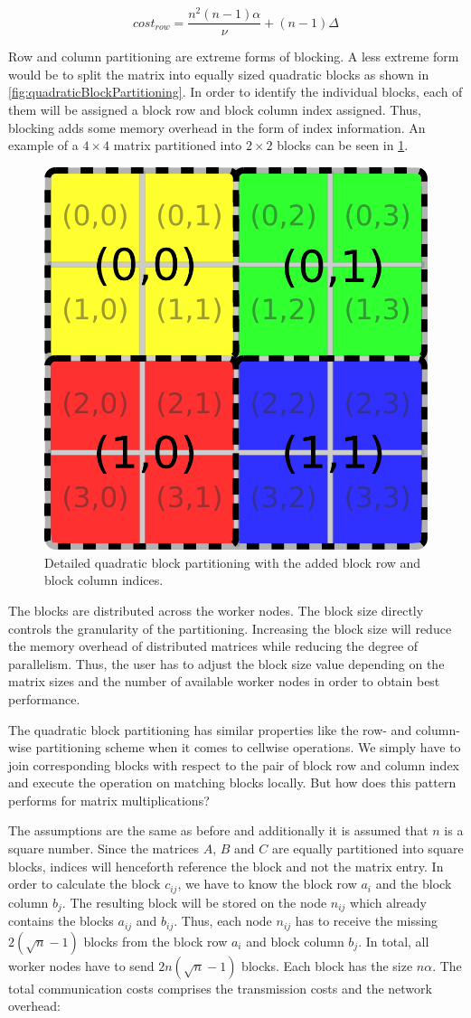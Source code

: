 \begin{displaymath}
	cost_{row} = \frac{n^2(n-1)\alpha}{\nu} + (n-1)\Delta
\end{displaymath}

Row and column partitioning are extreme forms of blocking.
A less extreme form would be to split the matrix into equally sized quadratic blocks as shown in \cref{fig:quadraticBlockPartitioning}.
In order to identify the individual blocks, each of them will be assigned a block row and block column index assigned.
Thus, blocking adds some memory overhead in the form of index information.
An example of a $4\times 4$ matrix partitioned into $2\times 2$ blocks can be seen in \cref{fig:quadraticBlockPartitioningDetailed}.

\begin{figure}[!h]
	\centering
	\includegraphics[width=0.25\linewidth]{images/quadraticBlockPartitioningDetailed.png}
	\caption{Detailed quadratic block partitioning with the added block row and block column indices.}
	\label{fig:quadraticBlockPartitioningDetailed}
\end{figure}

The blocks are distributed across the worker nodes.
The block size directly controls the granularity of the partitioning.
Increasing the block size will reduce the memory overhead of distributed matrices while reducing the degree of parallelism.
Thus, the user has to adjust the block size value depending on the matrix sizes and the number of available worker nodes in order to obtain best performance.

The quadratic block partitioning has similar properties like the row- and column-wise partitioning scheme when it comes to cellwise operations.
We simply have to join corresponding blocks with respect to the pair of block row and column index and execute the operation on matching blocks locally.
But how does this pattern performs for matrix multiplications?

The assumptions are the same as before and additionally it is assumed that $n$ is a square number.
Since the matrices $A$, $B$ and $C$ are equally partitioned into square blocks, indices will henceforth reference the block and not the matrix entry.
In order to calculate the block $c_{ij}$, we have to know the block row $a_{i}$ and the block column $b_{j}$.
The resulting block will be stored on the node $n_{ij}$ which already contains the blocks $a_{ij}$ and $b_{ij}$.
Thus, each node $n_{ij}$ has to receive the missing $2\left(\sqrt{n}-1\right)$ blocks from the block row $a_{i}$ and block column $b_{j}$.
In total, all worker nodes have to send $2n\left(\sqrt{n}-1\right)$ blocks.
Each block has the size $n\alpha$.
The total communication costs comprises the transmission costs and the network overhead:

